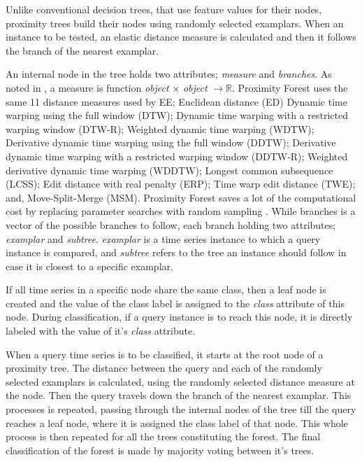 Unlike conventional decision trees, that use feature values for their nodes, proximity trees build their nodes using randomly selected examplars.
When an instance to be tested, an elastic distance measure is calculated and then it follows the branch of the nearest examplar.

An internal node in the tree holds two attributes; \emph{measure} and \emph{branches}.
As noted in \cite{lucas2019proximity}, a measure is function \emph{object} $\times$ \emph{object} $\rightarrow\mathbb{R}$.
Proximity Forest uses the same 11 distance measures used by EE; Euclidean distance (ED) Dynamic time warping using the full window (DTW);
Dynamic time warping with a restricted warping window (DTW-R); Weighted dynamic time warping (WDTW);
Derivative dynamic time warping using the full window (DDTW); Derivative dynamic time warping with a restricted warping window (DDTW-R);
Weighted derivative dynamic time warping (WDDTW); Longest common subsequence (LCSS); Edit distance with real penalty (ERP);
Time warp edit distance (TWE); and, Move-Split-Merge (MSM).
Proximity Forest saves a lot of the computational cost by replacing parameter searches with random sampling \cite{fawaz2020inceptiontime,fawaz2019deepreview}.
While branches is a vector of the possible branches to follow, each branch holding two attributes; \emph{examplar} and \emph{subtree}.
\emph{examplar} is a time series instance to which a query instance is compared, and \emph{subtree} refers to the tree an instance should follow
in case it is closest to a specific examplar.

If all time series in a specific node share the same class, then a leaf node is created and the value of the class label is assigned to the \emph{class}
attribute of this node. During classification, if a query instance is to reach this node, it is directly labeled with the value of it's \emph{class} attribute.

When a query time series is to be classified, it starts at the root node of a proximity tree.
The distance between the query and each of the randomly selected examplars is calculated, using the randomly selected distance measure at the node.
Then the query travels down the branch of the nearest examplar. This processes is repeated, passing through the internal nodes of the tree
till the query reaches a leaf node, where it is assigned the class label of that node. This whole process is then repeated for all the trees
constituting the forest. The final classification of the forest is made by majority voting between it's trees.

